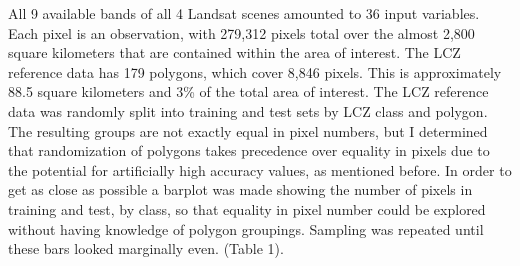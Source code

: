\documentclass[
]{article}
\begin{document}
All 9 available bands of all 4 Landsat scenes amounted to 36 input
variables. Each pixel is an observation, with 279,312 pixels total over
the almost 2,800 square kilometers that are contained within the area of
interest. The LCZ reference data has 179 polygons, which cover 8,846
pixels. This is approximately 88.5 square kilometers and 3\% of the
total area of interest. The LCZ reference data was randomly split into
training and test sets by LCZ class and polygon. The resulting groups
are not exactly equal in pixel numbers, but I determined that
randomization of polygons takes precedence over equality in pixels due
to the potential for artificially high accuracy values, as mentioned
before. In order to get as close as possible a barplot was made showing
the number of pixels in training and test, by class, so that equality in
pixel number could be explored without having knowledge of polygon
groupings. Sampling was repeated until these bars looked marginally
even. (Table 1).
\end{document}
